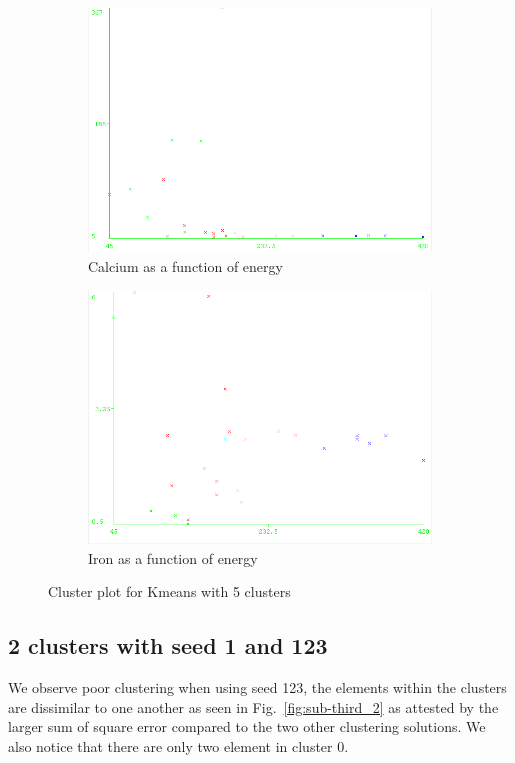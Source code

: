\documentclass[letterpaper,12pt]{article}
\begin{document}
\begin{figure}[H]
\begin{subfigure}{.4\textwidth}
  \centering
  \includegraphics[width=.8\linewidth]{kmeans_seed10_5cl_energy_calcium}  
  \caption{Calcium as a function of energy}
  \label{fig:sub-third_3}
\end{subfigure}
\begin{subfigure}{.4\textwidth}
  \centering
  \includegraphics[width=.8\linewidth]{kmeans_seed10_5cl_energy_iron}  
  \caption{Iron as a function of energy}
  \label{fig:sub-fourth_3}
\end{subfigure}
\caption{Cluster plot for Kmeans with 5 clusters}
\label{fig:fig_3}
\end{figure}



\subsection{2 clusters with seed 1 and 123}

We observe poor clustering when using seed 123, the elements within the clusters are dissimilar to one another as seen in Fig.~\ref{fig:sub-third_2} as attested by the larger sum of square error compared to the two other clustering solutions. We also notice that there are only two element in cluster 0.
\end{document}
